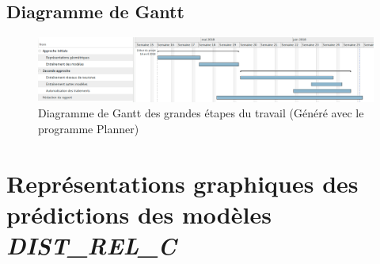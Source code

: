 \begin{landscape}


\chapter{Diagramme de Gantt}
\label{gantt}
\begin{figure}[!h]
	\centering

	\includegraphics[scale=0.45]{images/gantt.png}	
	
	\caption{Diagramme de Gantt des grandes étapes du travail (Généré avec le programme Planner)}
\end{figure}

\end{landscape}


\chapter{Représentations graphiques des prédictions des modèles \emph{DIST\_REL\_C}}

\label{annexes_plots_dist_rel_c}

